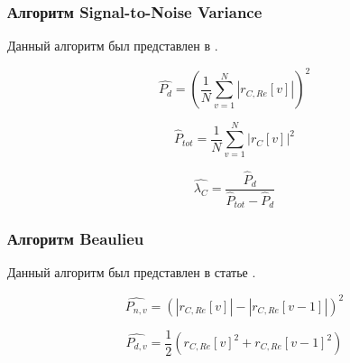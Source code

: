 \subsubsection{Алгоритм Signal-to-Noise Variance}
\label{sssec:snv}

Данный алгоритм был представлен в \cite{snr_pauluzzi, snr_li}.

\begin{center}
\begin{equation}
	\hat{P_{d}} = (\frac{1}{N} \sum \limits_{v=1}^N \left| r_{C,Re}[v] \right|)^2
\end{equation}
\end{center}

\begin{center}
\begin{equation}
	\hat P_{tot} = \frac{1}{N} \sum \limits_{v=1}^{N} \left|r_C[v] \right| ^2
\end{equation}
\end{center}

\begin{center}
\begin{equation}
	\hat{\lambda_C} = \frac{\hat P_d}{\hat P_{tot} - \hat P_d}
\end{equation}
\end{center}

\subsubsection{Алгоритм Beaulieu}
\label{sssec:beaulieu}

Данный алгоритм был представлен в статье \cite{snr_beaulieu}.

\begin{center}
\begin{equation}
	\hat{P_{n,v}} = (\left| r_{C,Re}[v] \right| - \left| r_{C,Re}[v-1] \right|)^2
\end{equation}
\end{center}

\begin{center}
\begin{equation}
	\hat{P_{d,v}} = \frac{1}{2}(r_{C,Re}[v]^2 + r_{C,Re}[v-1]^2)
\end{equation}
\end{center}

